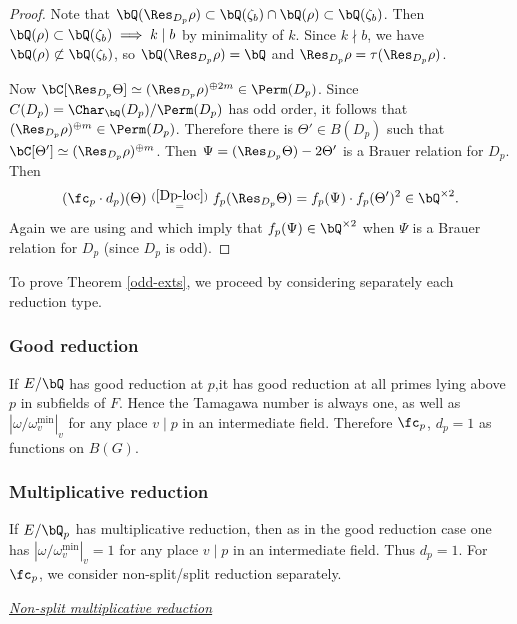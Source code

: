 \begin{proof}
    Note that $\bQ(\Res_{D_p}{\rho}) \subset \bQ(\zeta_b) \cap \bQ(\rho) \subset \bQ(\zeta_b)$. Then $\bQ(\rho) \subset \bQ(\zeta_b) \implies k \mid b$ by minimality of $k$. Since $k \nmid b$, we have $\bQ(\rho) \not\subset \bQ(\zeta_b)$, so $\bQ(\Res_{D_p} \rho) = \bQ$ and $\Res_{D_p} \rho = \tau (\Res_{D_p} \rho)$. 
    
    Now $\bC[\Res_{D_p} \Theta] \simeq (\Res_{D_p} \rho)^{\oplus 2 m} \in \Perm(D_p)$. Since $C(D_p) = \Char_{\bQ}(D_p) / \Perm(D_p)$ has odd order, it follows that $(\Res_{D_p} \rho)^{\oplus m} \in \Perm(D_p)$.  
    Therefore there is $\Theta' \in B(D_p)$ such that $\bC[\Theta'] \simeq (\Res_{D_p} \rho)^{\oplus m}$. Then $\Psi = (\Res_{D_p}\Theta) - 2 \Theta'$ is a Brauer relation for $D_p$. Then 
    \[(\fc_p \cdot d_p)(\Theta) \ {\ov{(\ref{Dp-loc})}{=}} \ f_p(\Res_{D_p}\Theta)
    = f_p(\Psi) \cdot f_p(\Theta')^2 \in \bQ^{\times 2}. \]
    Again we are using \cite[Theorem 2.47]{reg-const} and \cite[Theorem 3.2]{reg-const} which imply that $f_p(\Psi) \in \bQ^{\times 2}$ when $\Psi$ is a Brauer relation for $D_p$ (since $D_p$ is odd).   
\end{proof}


To prove Theorem \ref{odd-exts}, we proceed by considering separately each reduction type.

\subsubsection*{Good reduction}
If $E / \bQ$ has good reduction at $p$,it has good reduction at all primes lying above $p$ in subfields of $F$. Hence the Tamagawa number is always one, as well as $\left|\omega / \omega_{v}^{\min}\right|_v$ for any place $v \mid p$ in an intermediate field. Therefore $\fc_p$, $d_p = 1$ as functions on $B(G)$.

\subsubsection*{Multiplicative reduction}

If $E / \bQ_p$ has multiplicative reduction, then as in the good reduction case one has $\left|\omega / \omega_{v}^{\min}\right|_v = 1$ for any place $v \mid p$ in an intermediate field. Thus $d_p = 1$.
For $\fc_p$, we consider non-split/split reduction separately.
\vspace{1em}

\noindent\underline{\textit{Non-split multiplicative reduction}}

